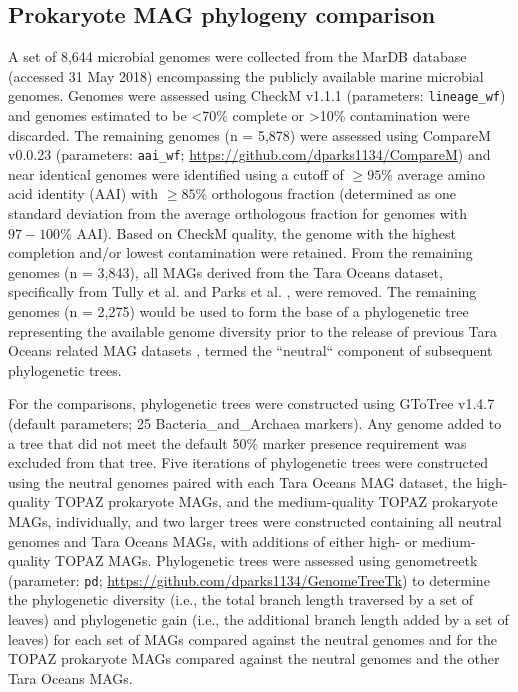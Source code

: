 \documentclass[12pt]{article}
\numberwithin{equation}{section}
\begin{document}
\subsection*{Prokaryote MAG phylogeny comparison} 
A set of 8,644 microbial genomes were collected from the MarDB database \citep{Klemetsen:2017fg}(accessed 31 May 2018) encompassing the publicly available marine microbial genomes. Genomes were assessed using CheckM 
v1.1.1 \citep{Parks2015CheckM}(parameters: \texttt{lineage\_wf}) and genomes estimated to be <70\% complete or >10\% contamination were discarded. The remaining genomes (n = 5,878) were assessed using CompareM v0.0.23
(parameters: \texttt{aai\_wf}; \url{https://github.com/dparks1134/CompareM}) and near identical genomes were identified using a cutoff of $\geq 95\%$ average amino acid identity (AAI) with $\geq 85\%$ orthologous fraction (determined as one standard deviation from the average orthologous fraction for genomes with $97-100\%$ AAI).
Based on CheckM quality, the genome with the highest completion and/or lowest contamination were retained. From the remaining genomes (n = 3,843), all MAGs derived from the Tara Oceans dataset, specifically from Tully et al. \citet{Tully2018reconstruction} and Parks et al. \citet{Parks2017Recovery}, were removed. The remaining genomes (n = 2,275) would be used to form the base of a phylogenetic tree representing the available genome diversity prior to the release of previous Tara Oceans related MAG datasets \citet{Tully2018reconstruction, Parks2017Recovery, Delmont2018Nitrogen-fixing}, termed the ``neutral`` component of subsequent phylogenetic trees.

For the comparisons, phylogenetic trees were constructed using GToTree v1.4.7 \citep{Lee_2019} (default parameters; 25 Bacteria\_and\_Archaea markers). Any genome added to a tree that did not meet the default 50\% marker presence requirement was excluded from that tree. Five iterations of phylogenetic trees were constructed using the neutral genomes paired with each Tara Oceans MAG dataset, the high-quality TOPAZ prokaryote MAGs, and the medium-quality TOPAZ prokaryote MAGs, individually, and two larger trees were constructed containing all neutral genomes and Tara Oceans MAGs, with additions of either high- or medium-quality TOPAZ MAGs. Phylogenetic trees were assessed using genometreetk (parameter: \texttt{pd}; \url{https://github.com/dparks1134/GenomeTreeTk}) to determine the phylogenetic diversity (i.e., the total branch length traversed by a set of leaves) and phylogenetic gain (i.e., the additional branch length added by a set of leaves) \citep{Parks2017Recovery} for each set of MAGs compared against the neutral genomes and for the TOPAZ prokaryote MAGs compared against the neutral genomes and the other Tara Oceans MAGs.
\end{document}
